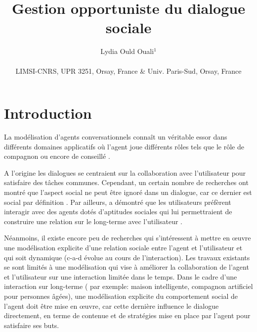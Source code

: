 \documentclass[a4paper,french]{article}
\begin{document}
	\title{\Large\bf Gestion opportuniste du dialogue sociale
				       }
			
				\author{Lydia Ould Ouali${}^1$\\
				 \\  LIMSI-CNRS, UPR 3251, Orsay, France \& Univ. Paris-Sud, Orsay, France \\
				}
				\maketitle
				\thispagestyle{empty}

\section{Introduction}

La modélisation d’agents conversationnels connaît un véritable essor dans différents domaines applicatifs où l'agent joue différents rôles tels que  le rôle de compagnon \cite{sidner2013always} ou encore de conseillé \cite{bickmore2005s}. 
\par A l'origine les dialogues se centraient sur la collaboration avec l’utilisateur pour satisfaire des tâches communes. Cependant, un certain nombre de recherches ont montré que l’aspect social ne peut être ignoré dans un dialogue, car ce dernier est social par définition \cite{markopoulos2005case}. Par ailleurs, \cite{moon1998intimate} a démontré que les utilisateurs préfèrent interagir avec des agents dotés d'aptitudes sociales qui lui permettraient de construire une relation sur le long-terme avec l'utilisateur \cite{bickmore2005establishing}.
 
\par Néanmoins, il existe encore peu de recherches qui s’intéressent à mettre en œuvre une modélisation explicite d’une relation sociale entre l’agent et l’utilisateur et qui soit dynamique (c-a-d évolue au cours de l'interaction). Les travaux existants se sont limités à une modélisation qui vise à améliorer la collaboration de l’agent et l'utilisateur sur une interaction limitée dans le temps. Dans le cadre d'une interaction sur long-terme ( par exemple: maison intelligente, compagnon artificiel pour personnes âgées), une modélisation explicite du comportement social de l’agent doit être mise en œuvre, car cette dernière influence le dialogue directement, en terme de contenue et de stratégies mise en place par l’agent pour satisfaire ses buts.
\end{document}
